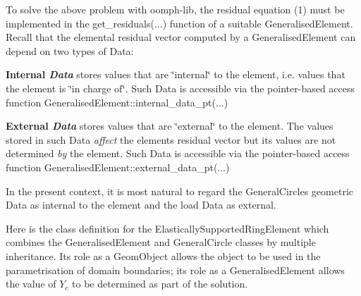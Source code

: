 To solve the above problem with {\ttfamily oomph-\/lib}, the residual equation (1) must be implemented in the {\ttfamily get\+\_\+residuals}(...) function of a suitable {\ttfamily Generalised\+Element}. Recall that the elemental residual vector computed by a {\ttfamily Generalised\+Element} can depend on two types of {\ttfamily Data\+:} 
\begin{DoxyItemize}
\item {\bfseries Internal {\itshape Data}} stores values that are \char`\"{}internal\char`\"{} to the element, i.\+e. values that the element is \char`\"{}in charge of\char`\"{}. Such {\ttfamily Data} is accessible via the pointer-\/based access function {\ttfamily Generalised\+Element\+::internal\+\_\+data\+\_\+pt}(...)
\item {\bfseries External {\itshape Data}} stores values that are \char`\"{}external\char`\"{} to the element. The values stored in such {\ttfamily Data} {\itshape affect} the element\textquotesingle{}s residual vector but its values are not determined {\itshape by} the element. Such {\ttfamily Data} is accessible via the pointer-\/based access function {\ttfamily Generalised\+Element\+::external\+\_\+data\+\_\+pt}(...)
\end{DoxyItemize}In the present context, it is most natural to regard the {\ttfamily General\+Circle\textquotesingle{}s} geometric {\ttfamily Data} as internal to the element and the load {\ttfamily Data} as external.

Here is the class definition for the {\ttfamily Elastically\+Supported\+Ring\+Element} which combines the {\ttfamily Generalised\+Element} and {\ttfamily General\+Circle} classes by multiple inheritance. Its role as a {\ttfamily Geom\+Object} allows the object to be used in the parametrisation of domain boundaries; its role as a {\ttfamily Generalised\+Element} allows the value of $ Y_c $ to be determined as part of the solution.

